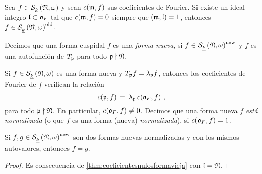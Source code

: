 \begin{teoCoeficientesNulosFormaVieja}%
	\label{thm:coeficientesnulosformavieja}
	Sea $f\in\spitz{k}{\frak{N},\omega}$ y sean $c(\frak{m},f)$ sus
	coeficientes de Fourier. Si existe un ideal \'{\i}ntegro
	$\frak{l}\subset\oka{F}$ tal que $c(\frak{m},f)=0$ siempre que
	$(\frak{m},\frak{l})=1$, entonces
	$f\in\spitzH{k}{\frak{N},\omega}^{\oude}$.
\end{teoCoeficientesNulosFormaVieja}

\begin{defFormaNueva}\label{def:formanueva}
	Decimos que una forma cuspidal $f$ es una \emph{forma nueva}, si
	$f\in\spitzH{k}{\frak{N},\omega}^{\neue}$ y $f$ es una autofunci\'{o}n
	de $T_{\frak{p}}$ para todo $\frak{p}\nmid\frak{N}$.
\end{defFormaNueva}

Si $f\in\spitzH{k}{\frak{N},\omega}$ es una forma nueva y
$T_{\frak{p}}f=\lambda_{\frak{p}}f$, entonces los coeficientes de Fourier de
$f$ verifican la relaci\'{o}n
\begin{equation}
	\label{eq:coeficientesdefourierformanueva}
	c(\frak{p},f) \,=\,\lambda_{\frak{p}}\,c(\oka{F},f)
	\text{ ,}
\end{equation}
%
para todo $\frak{p}\nmid\frak{N}$. En particular, $c(\oka{F},f)\not=0$. Decimos
que una forma nueva $f$ \emph{est\'{a} normalizada} (o que $f$ es una forma
(nueva) \emph{normalizada}), si $c(\oka{F},f)=1$.

\begin{coroCoeficientesNulosFormaVieja}%
	\label{coro:coeficientesnulosformavieja}
	Si $f,g\in\spitzH{k}{\frak{N},\omega}^{\neue}$ son dos formas nuevas
	normalizadas y con los mismos autovalores, entonces $f=g$.
\end{coroCoeficientesNulosFormaVieja}

\begin{proof}
	Es consecuencia de \ref{thm:coeficientesnulosformavieja} con
	$\frak{l}=\frak{N}$.
\end{proof}

